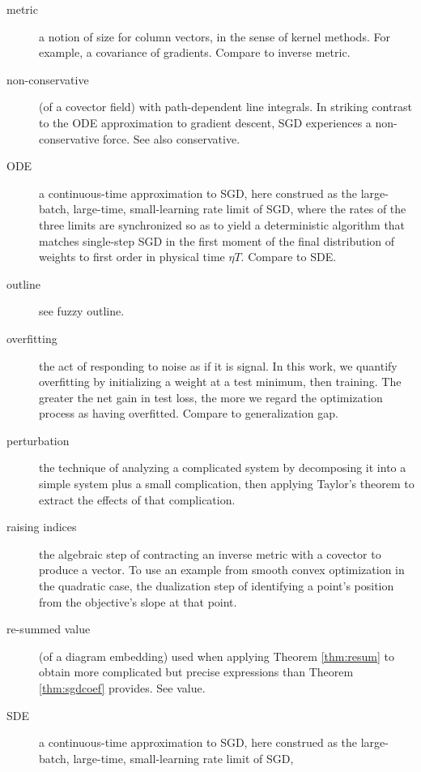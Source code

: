 \documentclass{article}
\theoremstyle{plain}
\theoremstyle{definition}
\begin{document}
\begin{description}
        \item[metric] a notion of size for column vectors, in the sense of
            kernel methods.  For example, a covariance of gradients.  Compare
            to inverse metric.
        \item[non-conservative] (of a covector field) with path-dependent line
            integrals.  In striking contrast to the ODE approximation to
            gradient descent, SGD experiences a non-conservative force.  See
            also conservative.
        \item[ODE] a continuous-time approximation to SGD, here construed as
            the large-batch, large-time, small-learning rate limit of SGD,
            where the rates of the three limits are synchronized so as to yield
            a deterministic algorithm that matches
            single-step SGD in the first moment of the final distribution
            of weights to first order in physical time $\eta T$.  Compare to
            SDE.
        \item[outline] see fuzzy outline.
        \item[overfitting] the act of responding to noise as if it is signal.
            In this work, we quantify overfitting by initializing a weight at a
            test minimum, then training.  The greater the net gain in test
            loss, the more we regard the optimization process as having
            overfitted.  Compare to generalization gap.
        \item[perturbation] the technique of analyzing a complicated system by
            decomposing it into a simple system plus a small complication, then
            applying Taylor's theorem to extract the effects of that
            complication.  
        \item[raising indices] the algebraic step of contracting an inverse
            metric with a covector to produce a vector.  To use an example from
            smooth convex optimization in the quadratic case, the dualization
            step of identifying a point's position from the objective's slope
            at that point.
        \item[re-summed value] (of a diagram embedding) used when applying
            Theorem \ref{thm:resum} to obtain more complicated but precise
            expressions than Theorem \ref{thm:sgdcoef} provides.  See value.
        \item[SDE] a continuous-time approximation to SGD, here construed as
            the large-batch, large-time, small-learning rate limit of SGD,

\end{description}
\end{document}

